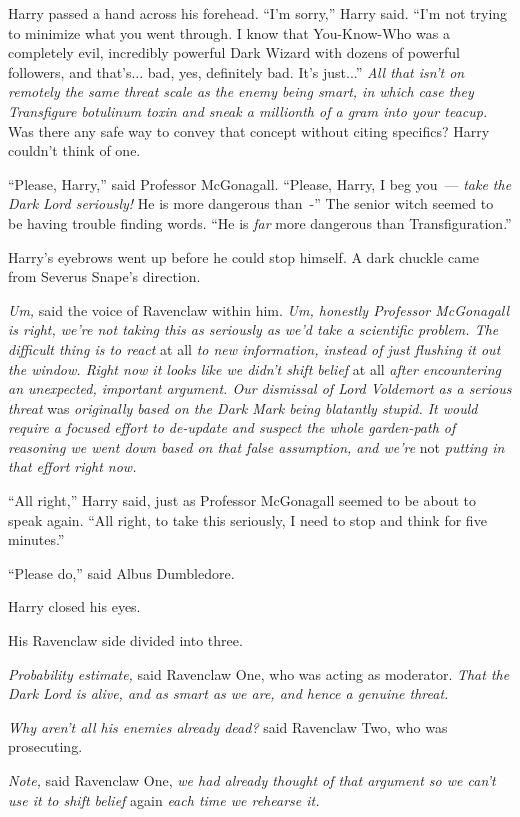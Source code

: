 Harry passed a hand across his forehead. ``I'm sorry,'' Harry said. ``I'm not trying to minimize what you went through. I know that You-Know-Who was a completely evil, incredibly powerful Dark Wizard with dozens of powerful followers, and that's... bad, yes, definitely bad. It's just...'' \emph{All that isn't on remotely the same threat scale as the enemy being smart, in which case they Transfigure botulinum toxin and sneak a millionth of a gram into your teacup.} Was there any safe way to convey that concept without citing specifics? Harry couldn't think of one.

``Please, Harry,'' said Professor McGonagall. ``Please, Harry, I beg you~--- \emph{take the Dark Lord seriously!} He is more dangerous than~-'' The senior witch seemed to be having trouble finding words. ``He is \emph{far} more dangerous than Transfiguration.''

Harry's eyebrows went up before he could stop himself. A dark chuckle came from Severus Snape's direction.

\emph{Um,} said the voice of Ravenclaw within him. \emph{Um, honestly Professor McGonagall is right, we're not taking this as seriously as we'd take a scientific problem. The difficult thing is to react} at all \emph{to new information, instead of just flushing it out the window. Right now it looks like we didn't shift belief} at all \emph{after encountering an unexpected, important argument. Our dismissal of Lord Voldemort as a serious threat} was \emph{originally based on the Dark Mark being blatantly stupid. It would require a focused effort to de-update and suspect the whole garden-path of reasoning we went down based on that false assumption, and we're} not \emph{putting in that effort right now.}

``All right,'' Harry said, just as Professor McGonagall seemed to be about to speak again. ``All right, to take this seriously, I need to stop and think for five minutes.''

``Please do,'' said Albus Dumbledore.

Harry closed his eyes.

His Ravenclaw side divided into three.

\emph{Probability estimate,} said Ravenclaw One, who was acting as moderator. \emph{That the Dark Lord is alive, and as smart as we are, and hence a genuine threat.}

\emph{Why aren't all his enemies already dead?} said Ravenclaw Two, who was prosecuting.

\emph{Note,} said Ravenclaw One, \emph{we had already thought of that argument so we can't use it to shift belief} again \emph{each time we rehearse it.}

